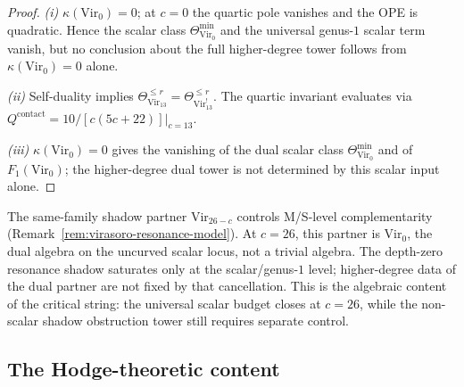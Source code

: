 \begin{proof}
\emph{(i)} $\kappa(\mathrm{Vir}_0) = 0$; at $c = 0$ the quartic pole
vanishes and the OPE is quadratic. Hence the scalar class
$\Theta_{\mathrm{Vir}_0}^{\min}$ and the universal genus-$1$ scalar
term vanish, but no conclusion about the full higher-degree tower
follows from $\kappa(\mathrm{Vir}_0)=0$ alone.

\emph{(ii)} Self-duality implies $\Theta_{\mathrm{Vir}_{13}}^{\leq r}
= \Theta_{\mathrm{Vir}_{13}^!}^{\leq r}$. The quartic invariant
evaluates via $Q^{\mathrm{contact}} = 10/[c(5c+22)]|_{c=13}$.

\emph{(iii)} $\kappa(\mathrm{Vir}_0) = 0$ gives the vanishing of the
dual scalar class $\Theta_{\mathrm{Vir}_0}^{\min}$ and of
$F_1(\mathrm{Vir}_0)$; the higher-degree dual tower is not determined
by this scalar input alone.
\end{proof}

\begin{remark}
\label{rem:g9-depth-zero-revisited}
The same-family shadow partner $\mathrm{Vir}_{26-c}$ controls
M/S-level complementarity
(Remark~\ref{rem:virasoro-resonance-model}). At $c = 26$, this
partner is $\mathrm{Vir}_0$, the dual algebra on the uncurved scalar
locus, not a trivial algebra. The depth-zero resonance shadow
saturates only at the scalar/genus-$1$ level; higher-degree data of the
dual partner are not fixed by that cancellation. This is the
algebraic content of the critical string: the universal scalar budget
closes at $c = 26$, while the non-scalar shadow obstruction tower still requires
separate control.
\end{remark}

%
%

\subsection{The Hodge-theoretic content}
\label{subsec:hodge-dichotomy}

